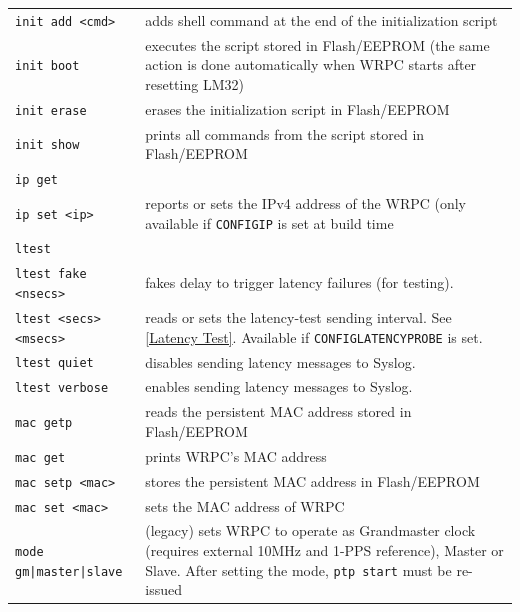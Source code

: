 \documentclass[a4paper, 12pt]{article}
\renewcommand{\_}{\underscore\allowbreak}
\newcommand{\code}[1]{\texttt{#1}}
\begin{document}
\begin{longtable}{  p{7.5cm}  p{7cm} }
  \code{init add <cmd>} & adds shell command at the end of the initialization
    script \\

  \code{init boot} & executes the script stored in Flash/EEPROM (the same
    action is done automatically when WRPC starts after resetting LM32) \\

  \code{init erase} & erases the initialization script in Flash/EEPROM  \\

  \code{init show} & prints all commands from the script stored in
    Flash/EEPROM \\

  \code{ip get} & \\
  \code{ip set <ip>} & reports or sets the IPv4 address of the WRPC (only
    available if \texttt{CONFIG\_IP} is set at build time \\

  \code{ltest} & \\
  \code{ltest fake <nsecs>} & fakes delay to trigger latency failures (for
    testing). \\

  \code{ltest <secs> <msecs>} & reads or sets the latency-test sending
    interval. See \ref{Latency Test}. Available if
    \texttt{CONFIG\_LATENCY\_PROBE} is set. \\

  \code{ltest quiet} & disables sending latency messages to Syslog. \\

  \code{ltest verbose} & enables sending latency messages to Syslog. \\

  \code{mac getp} & reads the persistent MAC address stored in Flash/EEPROM \\

  \code{mac get} & prints WRPC's MAC address \\

  \code{mac setp <mac>} & stores the persistent MAC address in Flash/EEPROM \\

  \code{mac set <mac>} & sets the MAC address of WRPC \\

  \code{mode gm|master|slave} & (legacy) sets WRPC to operate as Grandmaster
    clock (requires external 10MHz and 1-PPS reference), Master or Slave.
    After setting the mode, \texttt{ptp start} must be re-issued \\


\end{longtable}
\end{document}
